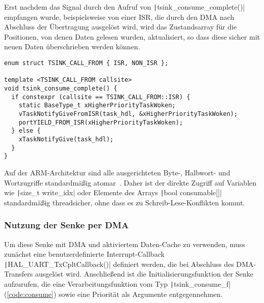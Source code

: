 Erst nachdem das Signal durch den Aufruf von
\texttt|tsink_consume_complete()| empfangen wurde, beispielsweise von
einer ISR, die durch den DMA nach Abschluss der Übertragung ausgelöst wird, wird
das Zustandsarray für die Positionen, von denen Daten gelesen wurden,
aktualisiert, so dass diese sicher mit neuen Daten überschrieben werden können.

\begin{code}
\begin{verbatim}
enum struct TSINK_CALL_FROM { ISR, NON_ISR };

template <TSINK_CALL_FROM callsite>
void tsink_consume_complete() {
  if constexpr (callsite == TSINK_CALL_FROM::ISR) {
    static BaseType_t xHigherPriorityTaskWoken;
    vTaskNotifyGiveFromISR(task_hdl, &xHigherPriorityTaskWoken);
    portYIELD_FROM_ISR(xHigherPriorityTaskWoken);
  } else {
    xTaskNotifyGive(task_hdl);
  }
}
\end{verbatim}
\end{code}

Auf der ARM-Architektur sind alle ausgerichteten Byte-, Halbwort- und
Wortzugriffe standardmäßig atomar~\cite[S. A3-79]{ARM_DDI0403_EE}. Daher ist der
direkte Zugriff auf Variablen wie \texttt|size_t write_idx| oder
Elemente des Arrays \texttt|bool consumable[]| standardmäßig
threadsicher, ohne dass es zu Schreib-Lese-Konflikten kommt.

\subsubsection{Nutzung der Senke per DMA}

Um diese Senke mit DMA und aktiviertem Daten-Cache zu verwenden, muss zunächst
eine benutzerdefinierte Interrupt-Callback
\texttt|HAL_UART_TxCpltCallback()| definiert werden, die bei Abschluss
des DMA-Transfers ausgelöst wird. Anschließend ist die Initialisierungsfunktion
der Senke aufzurufen, die eine Verarbeitungsfunktion vom Typ
\texttt|tsink_consume_f| (\ref{code:consume}) sowie eine Priorität als
Argumente entgegennehmen.

